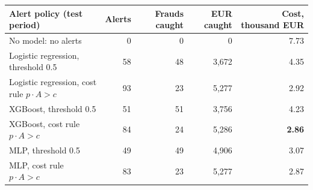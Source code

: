 \begin{tabular}{lrrrr}
\toprule
Alert policy (test period) & Alerts & Frauds caught & EUR caught & Cost, thousand EUR \\
\midrule
No model: no alerts & 0 & 0 & 0 & 7.73 \\
Logistic regression, threshold 0.5 & 58 & 48 & 3,672 & 4.35 \\
Logistic regression, cost rule $p\cdot A>c$ & 93 & 23 & 5,277 & 2.92 \\
XGBoost, threshold 0.5 & 51 & 51 & 3,756 & 4.23 \\
XGBoost, cost rule $p\cdot A>c$ & 84 & 24 & 5,286 & \textbf{2.86} \\
MLP, threshold 0.5 & 49 & 49 & 4,906 & 3.07 \\
MLP, cost rule $p\cdot A>c$ & 83 & 23 & 5,277 & 2.87 \\
\bottomrule
\end{tabular}
